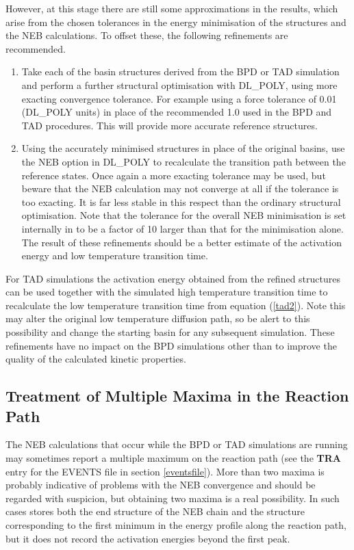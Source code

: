 However, at this stage there are still some approximations in the
results, which arise from the chosen tolerances in the energy
minimisation of the structures and the NEB calculations. To offset
these, the following refinements are recommended.
\begin{enumerate}
\item Take each of the basin structures derived from the BPD or TAD 
  simulation and perform a further structural optimisation with
  DL\_POLY, using more exacting convergence tolerance. For example
  using a force tolerance of 0.01 (DL\_POLY units) in place of the
  recommended 1.0 used in the BPD and TAD procedures. This will
  provide more accurate reference structures.
\item Using the accurately minimised structures in place of the original
  basins, use the NEB option in DL\_POLY to recalculate the transition
  path between the reference states. Once again a more exacting
  tolerance may be used, but beware that the NEB calculation may not
  converge at all if the tolerance is too exacting. It is far less
  stable in this respect than the ordinary structural
  optimisation. Note that the tolerance for the overall NEB
  minimisation is set internally in \D{} to be a factor of 10 larger
  than that for the minimisation alone. The result of these
  refinements should be a better estimate of the activation energy and
  low temperature transition time.
\end{enumerate}

For TAD simulations the activation energy obtained from the refined
structures can be used together with the simulated high temperature
transition time to recalculate the low temperature transition time
from equation (\ref{tad2}). Note this may alter the original low
temperature diffusion path, so be alert to this possibility and change
the starting basin for any subsequent simulation. These refinements
have no impact on the BPD simulations other than to improve the
quality of the calculated kinetic properties.

\subsection{Treatment of Multiple Maxima in the Reaction Path}

The NEB calculations that occur while the BPD or TAD simulations are
running may sometimes report a multiple maximum on the reaction path
(see the {\bf TRA } entry for the EVENTS file in section
\ref{eventsfile}). More than two maxima is probably indicative of
problems with the NEB convergence and should be regarded with
suspicion, but obtaining two maxima is a real possibility. In such
cases \D{} stores both the end structure of the NEB chain and the
structure corresponding to the first minimum in the energy profile
along the reaction path, but it does not record the activation
energies beyond the first peak.

